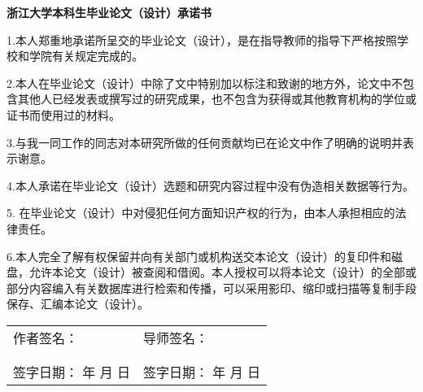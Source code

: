 {

  \setlength{\parindent}{0em}
  \linespread{1}

  \vspace*{0.7em}

  {
    \centering
    \stfangsong\sanhao\bfseries
    浙江大学本科生毕业论文（设计）承诺书 \par
  }

  \vspace{1em}

  {
    \setlength{\parindent}{2em}
    \linespread{1.8}
    \stfangsong\sihao
    1.本人郑重地承诺所呈交的毕业论文（设计），是在指导教师的指导下严格按照学校和学院有关规定完成的。\par
    2.本人在毕业论文（设计）中除了文中特别加以标注和致谢的地方外，论文中不包含其他人已经发表或撰写过的研究成果，也不包含为获得\underline{\stfangsong\sihao\bfseries {}}或其他教育机构的学位或证书而使用过的材料。\par
    3.与我一同工作的同志对本研究所做的任何贡献均已在论文中作了明确的说明并表示谢意。 \par
    4.本人承诺在毕业论文（设计）选题和研究内容过程中没有伪造相关数据等行为。\par
    5. 在毕业论文（设计）中对侵犯任何方面知识产权的行为，由本人承担相应的法律责任。\par
    6.本人完全了解\underline{\stfangsong\sihao\bfseries {}}有权保留并向有关部门或机构送交本论文（设计）的复印件和磁盘，允许本论文（设计）被查阅和借阅。本人授权\underline{\stfangsong\sihao\bfseries {}}可以将本论文（设计）的全部或部分内容编入有关数据库进行检索和传播，可以采用影印、缩印或扫描等复制手段保存、汇编本论文（设计）。 \par

  }

  \vspace{4.9em}

  {
    \fangsong\sihao
    \begin{tabular}{@{} p{0.5\linewidth} p{0.5\linewidth} @{}}
    作者签名： & 导师签名： \\
     & \\
     & \\
    签字日期： \hspace{2em} 年 \hspace{1em} 月 \hspace{1em} 日 & 签字日期： \hspace{2em} 年 \hspace{1em} 月 \hspace{1em} 日 \\
    \end{tabular} \par
  }
}
